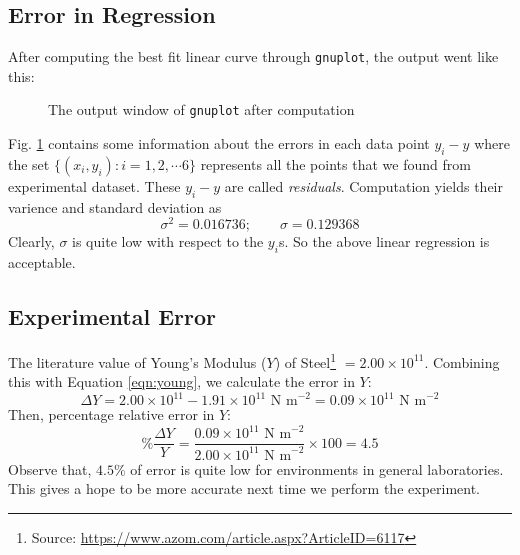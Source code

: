 \documentclass[11pt]{scrartcl}
\begin{document}
\subsection{Error in Regression}
After computing the best fit linear curve through \texttt{gnuplot}, the output went like this:
\begin{figure}[h]
    \centering
    \caption{The output window of \texttt{gnuplot} after computation}
    \label{fig:gnuplot}
\end{figure}

\newpage

Fig. \ref{fig:gnuplot} contains some information about the errors in each data point \(y_i - y\) where the set \(\{(x_i, y_i) : i = 1, 2, \cdots 6\}\) represents all the points that we found from experimental dataset. These \(y_i - y\) are called \emph{residuals}. Computation yields their varience and standard deviation as \[\sigma^2 = 0.016736; \qquad \sigma = 0.129368\] Clearly, \(\sigma\) is quite low with respect to the \(y_i\)s. So the above linear regression is acceptable.

\subsection{Experimental Error}

The literature value of Young's Modulus (\(Y\)) of Steel\footnote{Source: \url{https://www.azom.com/article.aspx?ArticleID=6117}} \(= 2.00 \times 10^{11}\). Combining this with Equation \ref{eqn:young}, we calculate the error in \(Y\): \[\Delta Y = 2.00 \times 10^{11} - 1.91 \times 10^{11} \text{ N m}^{-2} = 0.09 \times 10^{11} \text{ N m}^{-2} \]
Then, percentage relative error in \(Y\): \[\% \frac{\Delta Y}{Y} = \frac{0.09 \times 10^{11} \text{ N m}^{-2}}{2.00 \times 10^{11} \text{ N m}^{-2}} \times 100 = 4.5\]
Observe that, \(4.5 \%\) of error is quite low for environments in general laboratories. This gives a hope to be more accurate next time we perform the experiment.
\end{document}
